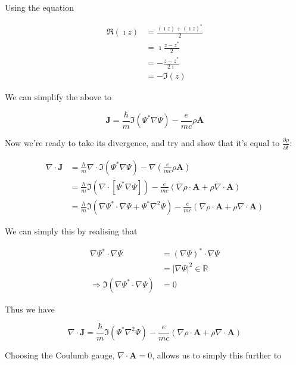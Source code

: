 \documentclass{article}
\begin{document}
Using the equation

\begin{align}
    \Re(\imath z) &= \frac{(\imath z) + (\imath z)^*}{2} \\
    &= \imath\frac{z-z^*}{2} \\
    &= -\frac{z-z^*}{2\imath} \\
    &= -\Im(z)
\end{align}

We can simplify the above to

\begin{equation}
    \mathbf{J} = \frac{\hbar}{m}\Im(\Psi^*\nabla\Psi) -
    \frac{e}{mc}\rho\mathbf{A}
\end{equation}

Now we're ready to take its divergence, and try and show that it's equal to
$\frac{\partial \rho}{\partial t}$:

\begin{align}
    \nabla \cdot \mathbf{J} &= \frac{\hbar}{m} \nabla \cdot \Im(\Psi^* \nabla
    \Psi) - \nabla\left(\frac{e}{mc}\rho\mathbf{A}\right) \\
    &= \frac{\hbar}{m}\Im(\nabla \cdot [\Psi^*\nabla\Psi]) - \frac{e}{mc}\left(
    \nabla \rho \cdot \mathbf{A} + \rho \nabla \cdot \mathbf{A} \right) \\
    &= \frac{\hbar}{m}\Im\left(\nabla \Psi^* \cdot \nabla \Psi + \Psi^*
    \nabla^2\Psi\right) - \frac{e}{mc}\left(\nabla \rho \cdot \mathbf{A} + \rho
    \nabla \cdot \mathbf{A}\right)
\end{align}

We can simply this by realising that

\begin{align}
    \nabla \Psi^* \cdot \nabla \Psi &= \left( \nabla \Psi \right)^* \cdot \nabla
    \Psi \\
    &= |\nabla \Psi|^2 \in \mathbb{R} \\
    \Rightarrow \Im\left(\nabla\Psi^* \cdot \nabla \Psi\right) &= 0
\end{align}

Thus we have

\begin{equation}
    \nabla \cdot \mathbf{J} = \frac{\hbar}{m} \Im \left( \Psi^* \nabla^2
    \Psi\right) - \frac{e}{mc}\left( \nabla \rho \cdot \mathbf{A} + \rho \nabla
    \cdot \mathbf{A} \right)
\end{equation}

Choosing the Coulumb gauge, $\nabla \cdot \mathbf{A} = 0$, allows us to simply
this further to
\end{document}
